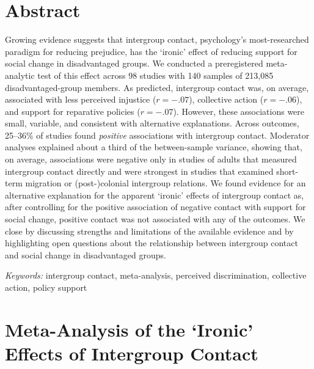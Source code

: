 \documentclass[12pt, letterpaper]{article}
\begin{document}
\section{Abstract}

\noindent Growing evidence suggests that intergroup contact, psychology's
most-researched paradigm for reducing prejudice, has the `ironic' effect
of reducing support for social change in disadvantaged groups. We
conducted a preregistered meta-analytic test of this effect across 98
studies with 140 samples of 213,085 disadvantaged-group members. As
predicted, intergroup contact was, on average, associated with less
perceived injustice (\(r = -.07\)), collective action (\(r = -.06\)),
and support for reparative policies (\(r = -.07\)). However, these
associations were small, variable, and consistent with alternative
explanations. Across outcomes, 25--36\% of studies found \emph{positive}
associations with intergroup contact. Moderator analyses explained about
a third of the between-sample variance, showing that, on average,
associations were negative only in studies of adults that measured
intergroup contact directly and were strongest in studies that examined
short-term migration or (post-)colonial intergroup relations. We found
evidence for an alternative explanation for the apparent `ironic'
effects of intergroup contact as, after controlling for the positive
association of negative contact with support for social change, positive
contact was not associated with any of the outcomes. We close by
discussing strengths and limitations of the available evidence and by
highlighting open questions about the relationship between intergroup
contact and social change in disadvantaged groups.

\textit{Keywords:} intergroup contact, meta-analysis, perceived discrimination, collective
action, policy support

\newpage

\section{Meta-Analysis of the `Ironic' Effects of Intergroup Contact}
\end{document}
